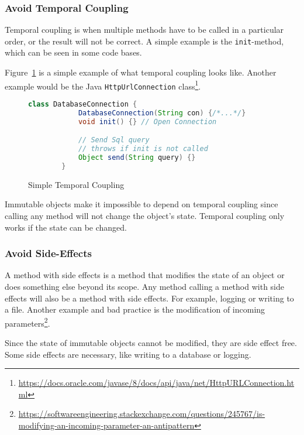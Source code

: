 \subsubsection{Avoid Temporal Coupling}\label{subsubsec:avoid-temporal-coupling}
Temporal coupling is when multiple methods have to be called in a particular order, or the result will not be correct.
A simple example is the \texttt{init}-method, which can be seen in some code bases.\cite{temporal-coupling}

Figure\ \ref{fig:temporal-coupling} is a simple example of what temporal coupling looks like.
Another example would be the Java \texttt{HttpUrlConnection} class\footnote{\url{https://docs.oracle.com/javase/8/docs/api/java/net/HttpURLConnection.html}}.

\begin{figure}[h]
    \caption{Simple Temporal Coupling}
    \begin{lstlisting}[language=Java,basicstyle=\tiny,label={lst:temporal-coupling}]
        class DatabaseConnection {
            DatabaseConnection(String con) {/*...*/}
            void init() {} // Open Connection

            // Send Sql query
            // throws if init is not called
            Object send(String query) {}
        }
    \end{lstlisting}
    \label{fig:temporal-coupling}
\end{figure}

Immutable objects make it impossible to depend on temporal coupling since calling any method will not change the object's state.
Temporal coupling only works if the state can be changed.\cite{elegant-objects}

\subsubsection{Avoid Side-Effects}
A method with side effects is a method that modifies the state of an object or does something else beyond its scope.
Any method calling a method with side effects will also be a method with side effects.
For example, logging or writing to a file.
Another example and bad practice is the modification of incoming parameters\footnote{\url{https://softwareengineering.stackexchange.com/questions/245767/is-modifying-an-incoming-parameter-an-antipattern}}.

Since the state of immutable objects cannot be modified, they are side effect free.
Some side effects are necessary, like writing to a database or logging.\cite{elegant-objects}

